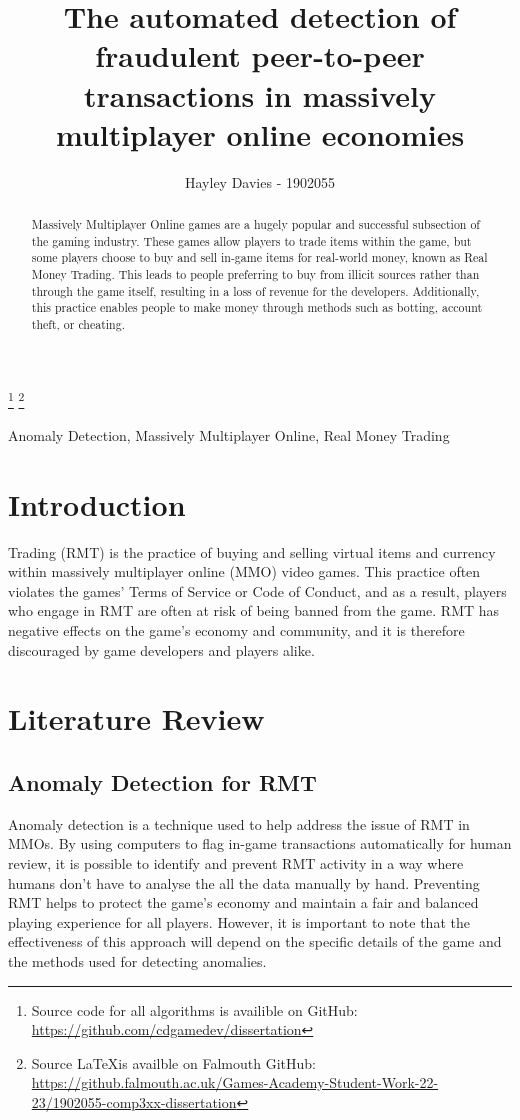 \documentclass[journal]{IEEEtran}
\begin{document}
\title{The automated detection of fraudulent peer-to-peer transactions in massively multiplayer online economies}
\author{Hayley Davies - 1902055}

\maketitle
\footnote{Source code for all algorithms is availible on GitHub: \url{https://github.com/cdgamedev/dissertation}}
\footnote{Source \LaTeX is availble on Falmouth GitHub: \url{https://github.falmouth.ac.uk/Games-Academy-Student-Work-22-23/1902055-comp3xx-dissertation}}

\begin{abstract}
Massively Multiplayer Online games are a hugely popular and successful subsection of the gaming industry. These games allow players to trade items within the game, but some players choose to buy and sell in-game items for real-world money, known as Real Money Trading. This leads to people preferring to buy from illicit sources rather than through the game itself, resulting in a loss of revenue for the developers. Additionally, this practice enables people to make money through methods such as botting, account theft, or cheating.
\end{abstract}

\begin{IEEEkeywords}
Anomaly Detection, Massively Multiplayer Online, Real Money Trading
\end{IEEEkeywords}


\section{Introduction}
 Trading (RMT) is the practice of buying and selling virtual items and currency within massively multiplayer online (MMO) video games. This practice often violates the games' Terms of Service or Code of Conduct\cite{AmazonGamesCOC}\cite{SquareEnixCOC}, and as a result, players who engage in RMT are often at risk of being banned from the game. RMT has negative effects on the game's economy and community, and it is therefore discouraged by game developers and players alike.

\section{Literature Review}
\subsection{Anomaly Detection for RMT}
\noindent Anomaly detection is a technique used to help address the issue of RMT in MMOs\cite{Tao2019}\cite{Ahmad2009}. By using computers to flag in-game transactions automatically for human review, it is possible to identify and prevent RMT activity in a way where humans don't have to analyse the all the data manually by hand. Preventing RMT helps to protect the game's economy and maintain a fair and balanced playing experience for all players. However, it is important to note that the effectiveness of this approach will depend on the specific details of the game and the methods used for detecting anomalies.
\end{document}
